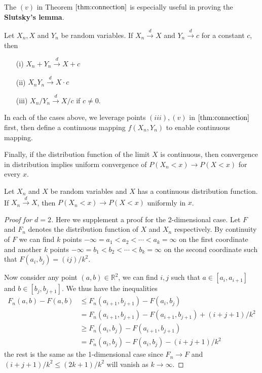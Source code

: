 \documentclass{article}
\begin{document}
The $(v)$ in Theorem $\ref{thm:connection}$ is especially useful in proving the \textbf{Slutsky's lemma}.
\begin{lemma}
    Let $X_n, X$ and $Y_n$ be random variables. If $X_n \xrightarrow{d} X$ and $Y_n \xrightarrow{d} c$ for a constant $c$, then
    \begin{enumerate}
        \item[(i)] $X_n + Y_n \xrightarrow{d} X + c$
        \item[(ii)] $X_n Y_n \xrightarrow{d} X \cdot c$
        \item[(iii)] $X_n / Y_n \xrightarrow{d} X / c$ if $c \neq 0$.
    \end{enumerate}
\end{lemma}
In each of the cases above, we leverage points $(iii), (v)$ in $\ref{thm:connection}$ first, then define a continuous mapping $f(X_n, Y_n)$ to enable continuous mapping.

Finally, if the distribution function of the limit $X$ is continuous, then convergence in distribution implies uniform convergence of $P(X_n < x) \to P(X < x)$ for every $x$.
\begin{lemma}
    Let $X_n$ and $X$ be random variables and $X$ has a continuous distribution function. If $X_n \xrightarrow{d} X$, then $P(X_n < x) \to P(X < x)$ uniformly in $x$.
\end{lemma}
\begin{proof}[Proof for $d = 2$]
    Here we supplement a proof for the 2-dimensional case. Let $F$ and $F_n$ denotes the distribution function of $X$ and $X_n$ respectively. By continuity of $F$ we can find $k$ points $-\infty = a_1 < a_2 < \cdots < a_{k} = \infty$ on the first coordinate and another $k$ points $-\infty = b_1 < b_2 < \cdots < b_{k} = \infty$ on the second coordinate such that $F(a_i, b_j) = (ij)/k^2$.

    Now consider any point $(a, b) \in \mathbb{R}^2$, we can find $i, j$ such that $a \in [a_i, a_{i+1}]$ and $b \in [b_j, b_{j+1}]$. We thus have the inequalities
    \begin{align*}
        F_n(a, b) - F(a, b) & \leq F_n(a_{i+1}, b_{j+1}) - F(a_i, b_j) \\ &= F_n(a_{i+1}, b_{j+1}) - F(a_{i+1}, b_{j+1}) + (i + j + 1)/k^2
        \\ &\geq F_n(a_{i}, b_{j}) - F(a_{i+1}, b_{j+1})
        \\ &= F_n(a_{i}, b_{j}) - F(a_{i}, b_{j}) - (i + j + 1)/k^2
    \end{align*}
    the rest is the same as the 1-dimensional case since $F_n \to F$ and $(i + j + 1)/k^2 \leq (2k + 1)/k^2$ will vanish as $k \to \infty$.
\end{proof}
\end{document}
